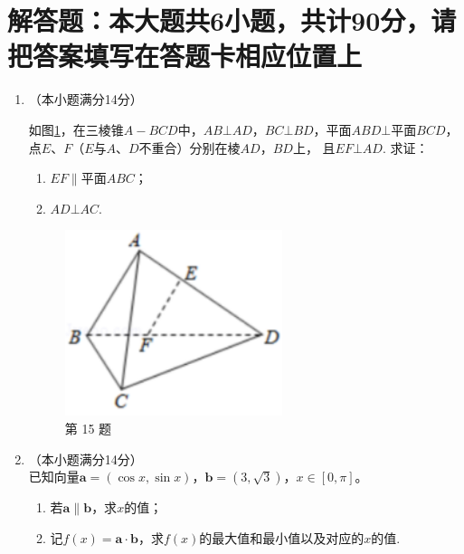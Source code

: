 \documentclass[12pt,space]{ctexart} %
\begin{document}
\section{解答题：本大题共6小题，共计90分，请把答案填写在答题卡相应位置上}
\begin{enumerate}[itemsep=-0.3em,topsep=0pt,resume]
  \item （本小题满分14分）\\[0.5em] 
    \begin{minipage}[h][20ex][t]{.63\textwidth}
      如图\ref{fig:t15}，在三棱锥$A-BCD$中，$AB\bot AD$，$BC\bot BD$，平面$ABD\bot$平面$BCD$，点$E$、$F$（$E$与$A$、$D$不重合）分别在棱$AD$，$BD$上，
      且$EF\bot AD$. 求证：
      \begin{enumerate}[itemsep=-0.3em,label={(\arabic*)},topsep=0pt,labelsep=.5em,leftmargin=1.7em]
        \item $EF\parallel$平面$ABC$；
        \item $AD\bot AC$.
      \end{enumerate}
    \end{minipage}
    \begin{minipage}[h][20ex][b]{.35\textwidth}
      \begin{figure}[H]
        \centering
        \includegraphics[width=0.6\textwidth]{Image/js-15.png}
        \caption{第 15 题}\label{fig:t15}
      \end{figure}
    \end{minipage}

  \item （本小题满分14分）\\
    已知向量$\boldsymbol{a}=(\cos x, \sin x)$，$\boldsymbol{b}=(3,\sqrt{3})$，$x\in [0,\pi]$。
    \begin{enumerate}[itemsep=-0.3em,label={(\arabic*)},topsep=0pt,labelsep=.5em,leftmargin=1.7em]
      \item 若$\boldsymbol{a}\parallel\boldsymbol{b}$，求$x$的值；
      \item 记$f(x)=\boldsymbol{a}\cdot\boldsymbol{b}$，求$f(x)$的最大值和最小值以及对应的$x$的值.
    \end{enumerate}
  \quad


\end{enumerate}
\end{document}
